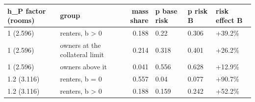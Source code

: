 \begingroup\small
\setlength{\tabcolsep}{3pt}
\renewcommand{\arraystretch}{1.04}
\begin{tabularx}{\linewidth}{XXrXXX}
\toprule
h\_P factor (rooms) & group & mass share & p base risk & p risk B & risk effect B \\
\midrule
1 (2.596) & renters, b \textgreater{} 0 & 0.188 & 0.22 & 0.306 & +39.2\% \\
1 (2.596) & owners at the collateral limit & 0.214 & 0.318 & 0.401 & +26.2\% \\
1 (2.596) & owners above it & 0.041 & 0.556 & 0.628 & +12.9\% \\
1.2 (3.116) & renters, b = 0 & 0.557 & 0.04 & 0.077 & +90.7\% \\
1.2 (3.116) & renters, b \textgreater{} 0 & 0.188 & 0.159 & 0.242 & +52.2\% \\
\bottomrule
\end{tabularx}
\endgroup
